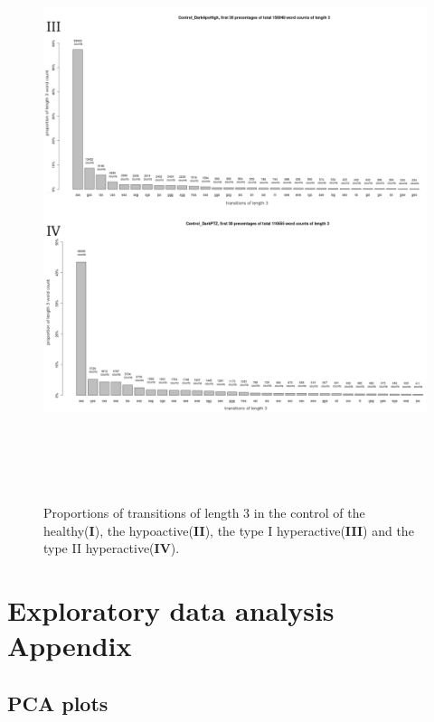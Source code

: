 \documentclass[a4paper,12pt]{article}
\begin{document}
\begin{figure}[h!]
\begin{center}
\includegraphics[width=15cm,height=17cm]{transitionsperboutlength2.png}
\caption{Proportions of transitions of length 3 in the control of the healthy(\textbf{I}), the hypoactive(\textbf{II}), the type I hyperactive(\textbf{III}) and the type II hyperactive(\textbf{IV}).}
\end{center}
\end{figure}
\section{Exploratory data analysis Appendix}
\subsection{PCA plots}




\end{document}
